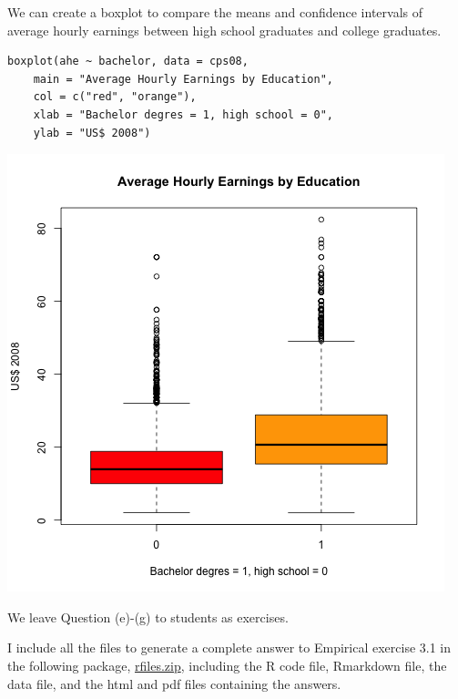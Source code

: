 \documentclass[a4paper,11pt]{article}
\begin{document}
We can create a boxplot to compare the means and confidence intervals
of average hourly earnings between high school graduates and college
graduates.

\begin{verbatim}
boxplot(ahe ~ bachelor, data = cps08,
	main = "Average Hourly Earnings by Education",
	col = c("red", "orange"),
	xlab = "Bachelor degres = 1, high school = 0",
	ylab = "US$ 2008")
\end{verbatim}

\begin{center}
\includegraphics[width=.9\linewidth]{figure/boxplot.png}
\end{center}

We leave Question (e)-(g) to students as exercises.

I include all the files to generate a complete answer to Empirical
exercise 3.1 in the following package, \url{rfiles.zip}, including the
R code file, Rmarkdown file, the data file, and the html and pdf files
containing the answers.
\end{document}
